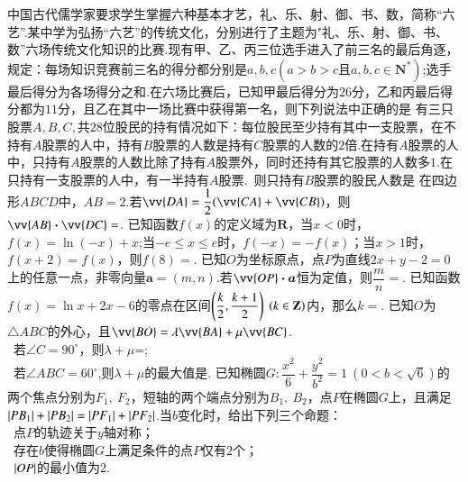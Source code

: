 \documentclass{BHCexam}
\begin{document}
\begin{questions}
\qs 中国古代儒学家要求学生掌握六种基本才艺，礼、乐、射、御、书、数，简称“六艺”.某中学为弘扬“六艺”的传统文化，分别进行了主题为"礼、乐、射、御、书、数”六场传统文化知识的比赛.现有甲、乙、丙三位选手进入了前三名的最后角逐，规定：每场知识竞赛前三名的得分都分别是$ a,b,c (a>b>c\text{且}a,b,c\in \mathbf{N^*})$;选手最后得分为各场得分之和.在六场比赛后，已知甲最后得分为$26$分，乙和丙最后得分都为$11$分，且乙在其中一场比赛中获得第一名，则下列说法中正确的是\xx
{}
\qs 有三只股票$ A,B,C ,\text{共}28$位股民的持有情况如下：每位股民至少持有其中一支股票，在不持有$ A $股票的人中，持有$ B $股票的人数是持有$ C $股票的人数的$ 2 $倍.在持有$ A $股票的人中，只持有$ A $股票的人数比除了持有$ A $股票外，同时还持有其它股票的人数多$ 1 $.在只持有一支股票的人中，有一半持有$ A $股票.~则只持有$ B $股票的股民人数是\xx
{}
\qs 在四边形$ ABCD $中，$ AB=2 $.若$ \vv{DA}=\dfrac{1}{2}(\vv{CA}+\vv{CB}) $，则$ \vv{AB}\bm{\cdot}\vv{DC} =$\tk.
\qs 已知函数$f(x)$的定义域为$ \mathbf{R} $，当$ x<0 $时，$f(x)=\ln (-x)+x $;当$ -e\le x\le e $时，$ f(-x)=-f(x) $；当$ x>1 $时，$ f(x+2)=f(x) $，则$f(8)=$\tk.
\qs 已知$ O $为坐标原点，点$ P $为直线$ 2x+y-2=0 $上的任意一点，非零向量$ \bm{a}=(m,n) .$若$ \vv{OP}\bm{\cdot a} $恒为定值，则$ \dfrac{m}{n}= $\tk.
\qs 已知函数$f(x)=\ln x+2x-6$的零点在区间$ \left(\dfrac{k}{2},\dfrac{k+1}{2}\right)~\left(k\in\mathbf{Z}\right) $内，那么$ k= $\tk.
\qs 已知$ O $为$\triangle ABC$的外心，且$ \vv{BO}=\lambda \vv{BA}+\mu \vv{BC} $.\\
~若$ \angle C=90^{\circ} $，则$ \lambda+\mu $=\tk;\\
~若$ \angle ABC =60^{\circ}$,则$ \lambda+\mu $的最大值是\tk.
\qs 已知椭圆$ G:\dfrac{x^2}{6}+\dfrac{y^2}{b^2}=1~\left(0<b<\sqrt{6}\right) $的两个焦点分别为$ F_1,~F_2 $，短轴的两个端点分别为$ B_1,~B_2 $，点$ P $在椭圆$ G $上，且满足$ \left|PB_1\right|+\left|PB_2\right| =\left|PF_1\right|+\left|PF_2\right|$.当$ b $变化时，给出下列三个命题：\\
~点$ P $的轨迹关于$y$轴对称；\\
~存在$ b $使得椭圆$ G $上满足条件的点$ P $仅有$ 2 $个；\\
~$ \left|OP\right| $的最小值为$ 2 $.\\

\end{questions}
\end{document}
